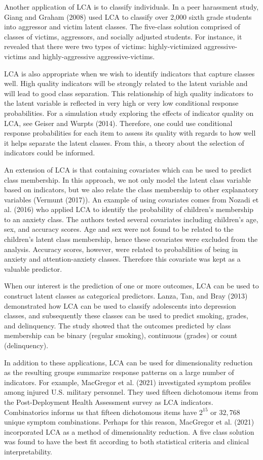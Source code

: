 \documentclass[
  ,man,floatsintext]{apa6}
\begin{document}
Another application of LCA is to classify individuals.
In a peer harassment study,
Giang and Graham (2008) used LCA to classify over 2,000 sixth grade students
into aggressor and victim latent classes.
The five-class solution comprised of classes of
victims, aggressors, and socially adjusted students.
For instance, it revealed that there were two types of victims:
highly-victimized aggressive-victims and highly-aggressive aggressive-victims.

LCA is also appropriate when we wish to identify indicators that capture classes well.
High quality indicators will be strongly related to the latent variable
and will lead to good class separation.
This relationship of high quality indicators to the latent variable
is reflected in very high or very low conditional response probabilities.
For a simulation study exploring the effects of indicator quality on LCA, see Geiser and Wurpts (2014).
Therefore, one could use conditional response probabilities for each item to assess its quality
with regards to how well it helps separate the latent classes.
From this, a theory about the selection of indicators could be informed.

An extension of LCA is that containing covariates which can be used to predict class membership.
In this approach, we not only model the latent class variable based on indicators,
but we also relate the class membership to other explanatory variables (Vermunt (2017)).
An example of using covariates comes from Nozadi et al. (2016)
who applied LCA to identify the probability of children's membership to an anxiety class.
The authors tested several covariates including children's age, sex, and accuracy scores.
Age and sex were not found to be related to the children's latent class membership,
hence these covariates were excluded from the analysis.
Accuracy scores, however, were related to probabilities of
being in anxiety and attention-anxiety classes.
Therefore this covariate was kept as a valuable predictor.

When our interest is the prediction of one or more outcomes,
LCA can be used to construct latent classes as categorical predictors.
Lanza, Tan, and Bray (2013) demonstrated how LCA can be used
to classify adolescents into depression classes,
and subsequently these classes can be used to predict smoking, grades, and delinquency.
The study showed that the outcomes predicted by class membership
can be binary (regular smoking), continuous (grades) or count (delinquency).

In addition to these applications, LCA can be used for dimensionality reduction
as the resulting groups summarize response patterns on a large number of indicators.
For example, MacGregor et al. (2021) investigated symptom profiles
among injured U.S. military personnel.
They used fifteen dichotomous items
from the Post-Deployment Health Assessment survey as LCA indicators.
Combinatorics informs us that fifteen dichotomous items have
\(2^{15}\) or \(32,768\) unique symptom combinations.
Perhaps for this reason, MacGregor et al. (2021) incorporated LCA
as a method of dimensionality reduction.
A five class solution was found to have the best fit
according to both statistical criteria and clinical interpretability.
\end{document}
